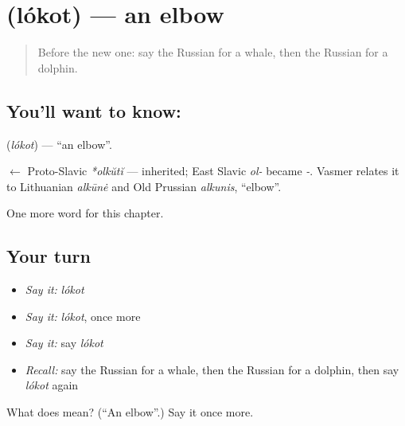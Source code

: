\section[\texorpdfstring{\ru{локоть} (lókot)}{локоть (lókot)}]{ (lókot) — an elbow}

\label{lesson:RU-C118-elbow}



\begin{quote}
Before the new one: say the Russian for a whale, then the Russian for a dolphin.
\end{quote}

\subsection*{You'll want to know: }
\textbf{} (\emph{lókot}) — \textquotedblleft{}an elbow\textquotedblright{}.

\begin{cousinweb}
\textbf{} $\leftarrow$ Proto-Slavic \emph{*olkŭtĭ} — inherited; East Slavic \emph{ol-} became \emph{-}. Vasmer relates it to Lithuanian \emph{alkūnė} and Old Prussian \emph{alkunis}, \textquotedblleft{}elbow\textquotedblright{}.
\end{cousinweb}

\begin{grammarlens}[title={What you've built}]
One more word for this chapter.
\end{grammarlens}

\subsection*{Your turn}
\begin{itemize}
\raggedright
  \item \emph{Say it:} \emph{lókot}
  \item \emph{Say it:} \emph{lókot}, once more
  \item \emph{Say it:} say \emph{lókot}
  \item \emph{Recall:} say the Russian for a whale, then the Russian for a dolphin, then say \emph{lókot} again
\end{itemize}

\begin{tcolorbox}[breakable,colback=teal!4,colframe=teal!35!black,title={Before you move on}]
What does  mean? (\textquotedblleft{}An elbow\textquotedblright{}.) Say it once more.
\end{tcolorbox}
